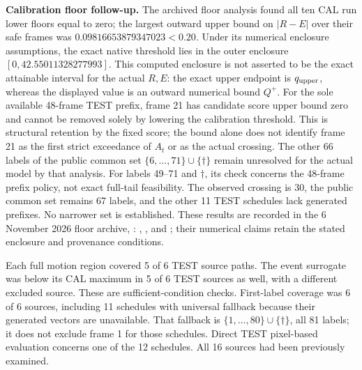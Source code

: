 \documentclass[11pt]{article}
\theoremstyle{noteplain}
\newcommand{\dates}[2]{\{#1,\ldots,#2\}}
\newcommand{\dd}{\dagger}
\begin{document}
\textbf{Calibration floor follow-up.} The archived floor analysis found all ten CAL run lower floors equal to zero; the largest outward upper bound on $|R-E|$ over their safe frames was $0.09816653879347023<0.20$. Under its numerical enclosure assumptions, the exact native threshold lies in the outer enclosure $[0,42.55011328277993]$. This computed enclosure is not asserted to be the exact attainable interval for the actual $R,E$: the exact upper endpoint is $q_{\rm upper}$, whereas the displayed value is an outward numerical bound $Q^+$. For the sole available 48-frame TEST prefix, frame 21 has candidate score upper bound zero and cannot be removed solely by lowering the calibration threshold. This is structural retention by the fixed score; the bound alone does not identify frame 21 as the first strict exceedance of $A_t$ or as the actual crossing. The other 66 labels of the public common set $\dates{6}{71}\cup\{\dd\}$ remain unresolved for the actual model by that analysis. For labels 49--71 and $\dd$, its check concerns the 48-frame prefix policy, not exact full-tail feasibility. The observed crossing is 30, the public common set remains 67 labels, and the other 11 TEST schedules lack generated prefixes. No narrower set is established. These results are recorded in the 6 November 2026 floor archive, \allowbreak{}: , , and ; their numerical claims retain the stated enclosure and provenance conditions.

Each full motion region covered 5 of 6 TEST source paths. The event surrogate was below its CAL maximum in 5 of 6 TEST sources as well, with a different excluded source. These are sufficient-condition checks. First-label coverage was 6 of 6 sources, including 11 schedules with universal fallback because their generated vectors are unavailable. That fallback is $\dates{1}{80}\cup\{\dd\}$, all 81 labels; it does not exclude frame 1 for those schedules. Direct TEST pixel-based evaluation concerns one of the 12 schedules. All 16 sources had been previously examined.
\end{document}
